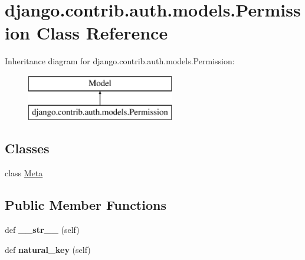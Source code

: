 \hypertarget{classdjango_1_1contrib_1_1auth_1_1models_1_1_permission}{}\section{django.\+contrib.\+auth.\+models.\+Permission Class Reference}
\label{classdjango_1_1contrib_1_1auth_1_1models_1_1_permission}
Inheritance diagram for django.\+contrib.\+auth.\+models.\+Permission\+:\begin{figure}[H]
\begin{center}
\leavevmode
\includegraphics[height=2.000000cm]{classdjango_1_1contrib_1_1auth_1_1models_1_1_permission}
\end{center}
\end{figure}
\subsection*{Classes}
\begin{DoxyCompactItemize}
\item 
class \mbox{\hyperlink{classdjango_1_1contrib_1_1auth_1_1models_1_1_permission_1_1_meta}{Meta}}
\end{DoxyCompactItemize}
\subsection*{Public Member Functions}
\begin{DoxyCompactItemize}
\item 
\mbox{\label{classdjango_1_1contrib_1_1auth_1_1models_1_1_permission_adfbb0b3835cfc2877a03a5043e2b6ade}} 
def {\bfseries \+\_\+\+\_\+str\+\_\+\+\_\+} (self)
\item 
\mbox{\label{classdjango_1_1contrib_1_1auth_1_1models_1_1_permission_a220ddcbbc7d9400339d135c8184f82bc}} 
def {\bfseries natural\+\_\+key} (self)
\end{DoxyCompactItemize}
